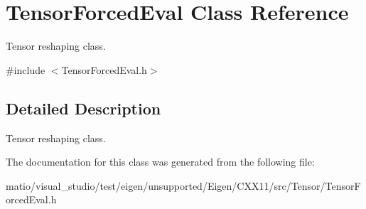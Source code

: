 \hypertarget{class_tensor_forced_eval}{}\section{Tensor\+Forced\+Eval Class Reference}
\label{class_tensor_forced_eval}


Tensor reshaping class.  




{\ttfamily \#include $<$Tensor\+Forced\+Eval.\+h$>$}



\subsection{Detailed Description}
Tensor reshaping class. 

The documentation for this class was generated from the following file\+:\begin{DoxyCompactItemize}
\item 
matio/visual\+\_\+studio/test/eigen/unsupported/\+Eigen/\+C\+X\+X11/src/\+Tensor/\+Tensor\+Forced\+Eval.\+h\end{DoxyCompactItemize}
